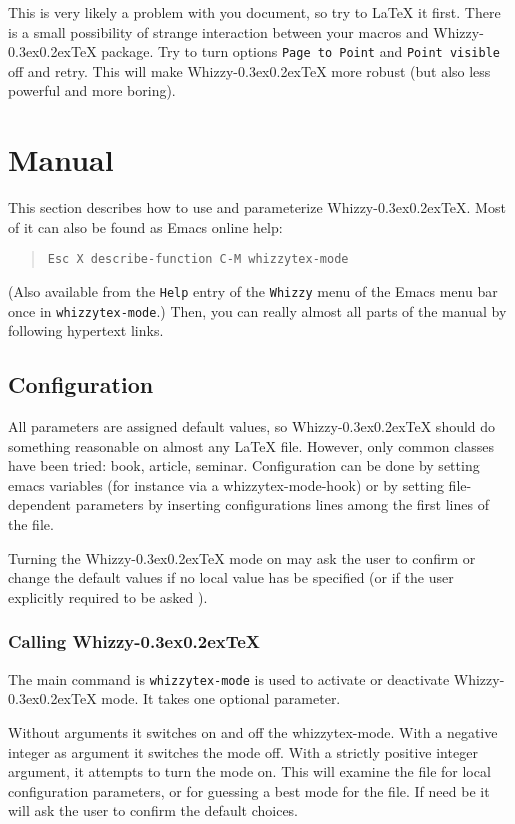 \documentclass{article}
\makeatletter
\let \lst \verb
\def \whizzy {{Whizzy\kern -0.3ex\raise 0.2ex\hbox{\let \@\relax\TeX}}}
\makeatother
\begin{document}
This is very likely a problem with you document, so try to {\LaTeX} it 
first. There is a small possibility of strange interaction between
your macros and {\whizzy} package. Try to turn options 
{\tt Page to Point} and {\tt Point visible} off and retry. 
This will make {\whizzy} more robust (but also less powerful and more
boring). 


\section {\label{manual}Manual} 

This section describes how to use and
parameterize {\whizzy}. Most of it can also be found as Emacs online help:
\begin{quote}
\begin{verbatim}
Esc X describe-function C-M whizzytex-mode
\end{verbatim}
\end{quote}
(Also available from the {\tt Help} entry of the {\tt Whizzy} menu of the Emacs
menu bar once in {\tt whizzytex-mode}.)  Then, you can really almost all
parts of the manual by following hypertext links. 


\subsection {Configuration} 

All parameters are assigned default values, so {\whizzy} should do something
reasonable on almost any {\LaTeX} file. However, only common classes have
been tried: book, article, seminar. 
Configuration can be done by setting emacs variables (for instance via a
whizzytex-mode-hook) or by setting file-dependent parameters by 
inserting configurations lines among the first lines of the file.

Turning the {\whizzy} mode on may ask the user to confirm or change the
default values if no local value has be specified 
(or if the user explicitly required to be asked
).


\subsubsection {Calling {\whizzy}}

The main command is \lst"whizzytex-mode" is used to activate or deactivate 
{\whizzy} mode. It takes one optional parameter. 

Without arguments it switches on and off the whizzytex-mode. With a negative
integer as argument it switches the mode off. With a strictly positive
integer argument, it attempts to turn the mode on.  This will examine the
file for local configuration parameters, or for guessing a best mode for the
file. If need be it will ask the user to confirm the default choices.
\end{document}
